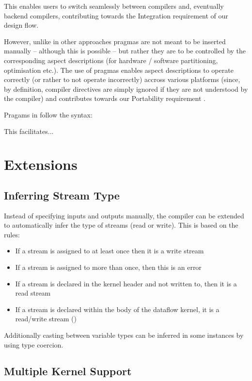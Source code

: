 This enables users to switch seamlessly between compilers and,
eventually backend compilers, contributing towards the Integration
requirement of our design flow.

However, unlike in other approaches  pragmas are not
meant to be inserted manually -- although this is possible -- but
rather they are to be controlled by the corresponding aspect
descriptions (for hardware / software partitioning, optimisation
etc.). The use of pragmas enables aspect descriptions to operate
correctly (or rather to not operate incorrectly) accross various
platforms (since, by definition, compiler directives are simply
ignored if they are not understood by the compiler) and contributes
towards our Portability requirement .

Pragams in \FAST{} follow the syntax:

This facilitates...

\section{Extensions}

\label{sec:fast-extensions}

\subsection{Inferring Stream Type}

Instead of specifying inputs and outputs manually, the \fastc{}
compiler can be extended to automatically infer the type of streams
(read or write). This is based on the rules:
\begin{itemize}
  \item If a stream is assigned to at least once then it is a write stream
  \item If a stream is assigned to more than once, then this is an error
  \item If a stream is declared in the kernel header and not written
    to, then it is a read stream
  \item If a stream is declared within the body of the dataflow
    kernel, it is a read/write stream ()
\end{itemize}

Additionally casting between variable types can be inferred in some
instances by using type coercion. 


\subsection{Multiple Kernel Support}

